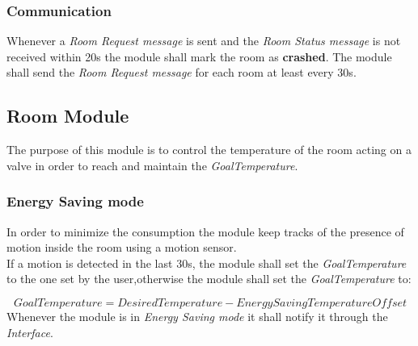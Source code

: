 \subsubsection{Communication}
Whenever a \textit{Room Request message} is sent and the \textit{Room Status message} is not received within 20s the module shall mark the room as \textbf{crashed}.
The module shall send the \textit{Room Request message} for each room at least every 30s.

\subsection{Room Module}
The purpose of this module is to control the temperature of the room acting on a valve in order to 
reach and maintain the \textit{GoalTemperature}.

\subsubsection{Energy Saving mode}
In order to minimize the consumption the module keep tracks of the presence of motion inside the room
using a motion sensor. \\

If a motion is detected in the last 30s, the module shall set the \textit{GoalTemperature} to the one set by the user,otherwise the module shall set the \textit{GoalTemperature} to:

\begin{equation}
	GoalTemperature = DesiredTemperature - EnergySavingTemperatureOffset
\end{equation}
Whenever the module is in \textit{Energy Saving mode} it shall notify it through the \textit{Interface}.

